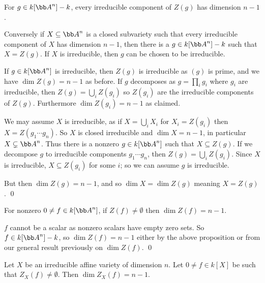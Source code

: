 \bprop

    \benum
        \item For $g\in k[\bA^n]-k$, every irreducible component of $Z(g)$ has dimension $n-1$.
        \item Conversely if $X\subseteq\bA^n$ is a closed subvariety such that every irreducible component of $X$ has dimension $n-1$, then there is a
        $g\in k[\bA^n]-k$ such that $X=Z(g)$.
        If $X$ is irreducible, then $g$ can be chosen to be irreducible.
    \eenum

\eprop

\bproof

    \benum
        \item If $g\in k[\bA^n]$ is irreducible, then $Z(g)$ is irreducible as $(g)$ is prime, and we have $\dim Z(g)=n-1$ as before.
        If $g$ decomposes as $g=\prod_ig_i$ where $g_i$ are irreducible, then $Z(g)=\bigcup_iZ(g_i)$ so $Z(g_i)$ are the irreducible components of $Z(g)$.
        Furthermore $\dim Z(g_i)=n-1$ as claimed.

        \item We may assume $X$ is irreducible, as if $X=\bigcup_iX_i$ for $X_i=Z(g_i)$ then $X=Z(g_1\cdots g_n)$.
        So $X$ is closed irreducible and $\dim X=n-1$, in particular $X\subsetneq\bA^n$.
        Thus there is a nonzero $g\in k[\bA^n]$ such that $X\subseteq Z(g)$.
        If we decompose $g$ to irreducible components $g_1\cdots g_n$, then $Z(g)=\bigcup_iZ(g_i)$.
        Since $X$ is irreducible, $X\subseteq Z(g_i)$ for some $i$; so we can assume $g$ is irreducible.

        But then $\dim Z(g)=n-1$, and so $\dim X=\dim Z(g)$ meaning $X=Z(g)$.
        \qed
    \eenum

\eproof

\bcoro

    For nonzero $0\neq f\in k[\bA^n]$, if $Z(f)\neq\emptyset$ then $\dim Z(f)=n-1$.

\ecoro

\bproof

    $f$ cannot be a scalar as nonzero scalars have empty zero sets.
    So $f\in k[\bA^n]-k$, so $\dim Z(f)=n-1$ either by the above proposition or from our general result previously on $\dim Z(f)$.
    \qed

\eproof

\blemm

    Let $X$ be an irreducible affine variety of dimension $n$.
    Let $0\neq f\in k[X]$ be such that $Z_X(f)\neq\emptyset$.
    Then $\dim Z_X(f)=n-1$.

